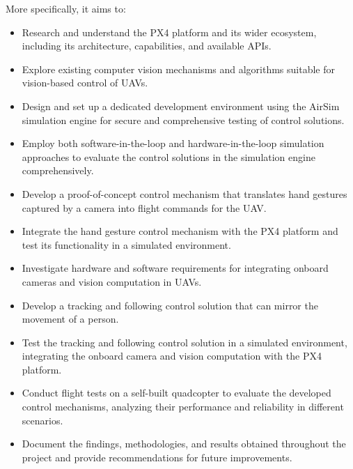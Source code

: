 More specifically, it aims to:
\begin{itemize}
    \item Research and understand the PX4 platform and its wider ecosystem, including its architecture, capabilities, and available APIs.
    \item Explore existing computer vision mechanisms and algorithms suitable for vision-based control of UAVs.
    \item Design and set up a dedicated development environment using the AirSim simulation engine for secure and comprehensive testing of control solutions.
    \item Employ both software-in-the-loop and hardware-in-the-loop simulation approaches to evaluate the control solutions in the simulation engine comprehensively.
    \item Develop a proof-of-concept control mechanism that translates hand gestures captured by a camera into flight commands for the UAV.
    \item Integrate the hand gesture control mechanism with the PX4 platform and test its functionality in a simulated environment.
    \item Investigate hardware and software requirements for integrating onboard cameras and vision computation in UAVs.
    \item Develop a tracking and following control solution that can mirror the movement of a person.
    \item Test the tracking and following control solution in a simulated environment, integrating the onboard camera and vision computation with the PX4 platform.
    \item Conduct flight tests on a self-built quadcopter to evaluate the developed control mechanisms, analyzing their performance and reliability in different scenarios.
    \item Document the findings, methodologies, and results obtained throughout the project and provide recommendations for future improvements.
\end{itemize}


